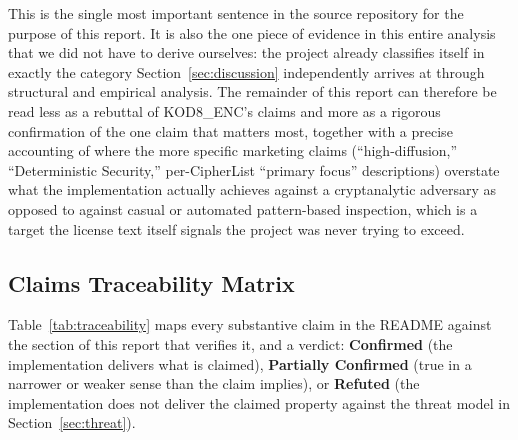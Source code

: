 \documentclass[11pt]{article}
\begin{document}
This is the single most important sentence in the source repository
for the purpose of this report. It is also the one piece of evidence
in this entire analysis that we did not have to derive ourselves: the
project already classifies itself in exactly the category
Section~\ref{sec:discussion} independently arrives at through
structural and empirical analysis. The remainder of this report can
therefore be read less as a rebuttal of KOD8\_ENC's claims and more as
a rigorous confirmation of the one claim that matters most, together
with a precise accounting of where the more specific marketing claims
(``high-diffusion,'' ``Deterministic Security,'' per-CipherList
``primary focus'' descriptions) overstate what the implementation
actually achieves against a cryptanalytic adversary as opposed to
against casual or automated pattern-based inspection, which is a
target the license text itself signals the project was never trying to
exceed.

\subsection{Claims Traceability Matrix}

Table~\ref{tab:traceability} maps every substantive claim in the
README against the section of this report that verifies it, and a
verdict: \textbf{Confirmed} (the implementation delivers what is
claimed), \textbf{Partially Confirmed} (true in a narrower or weaker
sense than the claim implies), or \textbf{Refuted} (the implementation
does not deliver the claimed property against the threat model in
Section~\ref{sec:threat}).
\end{document}
